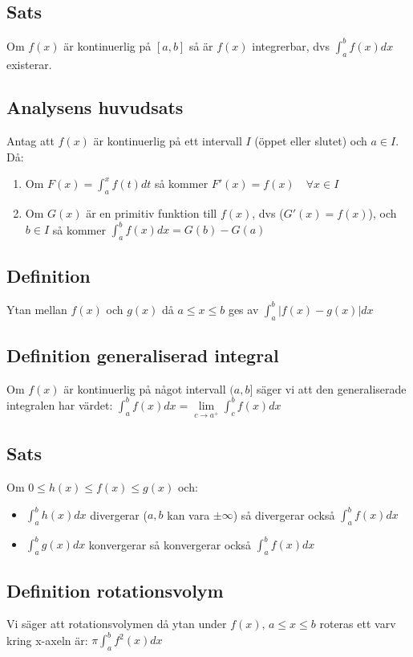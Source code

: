 \documentclass{article}
\begin{document}
\subsection{Sats}
Om $f(x)$ är kontinuerlig på $[a,b]$ så är $f(x)$ integrerbar, dvs ${\displaystyle\int_{a}^{b}f(x)dx}$ existerar.

\subsection{Analysens huvudsats}
Antag att $f(x)$ är kontinuerlig på ett intervall $I$ (öppet eller slutet) och $a\in I$. Då:
\begin{enumerate}
   \item Om ${\displaystyle F(x)=\int_{a}^{x}f(t)dt}$ så kommer $F'(x)=f(x)\quad \forall x\in I$
   \item Om $G(x)$ är en primitiv funktion till $f(x)$, dvs ($G'(x)=f(x)$), och $b\in I$ så kommer ${\displaystyle\int_{a}^{b}f(x)dx=G(b)-G(a)}$
\end{enumerate}

\subsection{Definition}
Ytan mellan $f(x)$ och $g(x)$ då $a\leq x\leq b$ ges av ${\displaystyle \int_{a}^{b} |f(x)-g(x)|dx}$

\subsection{Definition generaliserad integral}
Om $f(x)$ är kontinuerlig på något intervall $(a,b]$ säger vi att den generaliserade integralen har värdet: ${\displaystyle\int_{a}^{b}f(x)dx=\lim\limits_{c\to a^{+}}\int_{c}^{b}f(x)dx}$

\subsection{Sats}
Om $0 \leq h(x) \leq f(x) \leq g(x)$ och:
\begin{itemize}
   \item ${\displaystyle\int_{a}^{b}h(x)dx}$ divergerar ($a,b$ kan vara $\pm\infty$) så divergerar också ${\displaystyle\int_{a}^{b}f(x)dx}$
   \item ${\displaystyle\int_{a}^{b}g(x)dx}$ konvergerar så konvergerar också ${\displaystyle\int_{a}^{b}f(x)dx}$
\end{itemize}

\subsection{Definition rotationsvolym}
Vi säger att rotationsvolymen då ytan under $f(x),\, a\leq x\leq b$ roteras ett varv kring x-axeln är: ${\displaystyle \pi\int_{a}^{b}f^2(x)dx  }$
\end{document}
